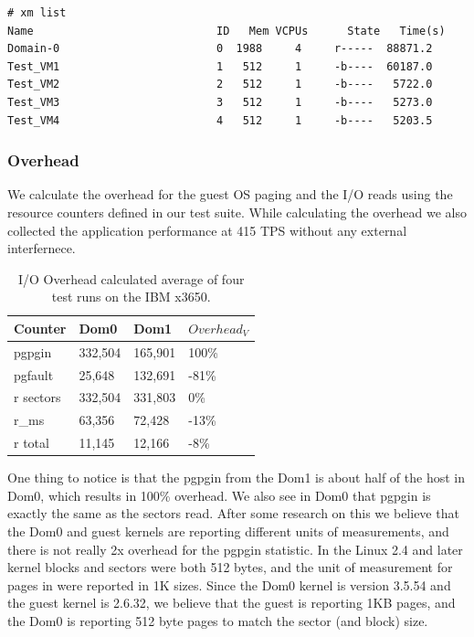 \begin{Verbatim}
# xm list
Name                            ID   Mem VCPUs      State   Time(s)
Domain-0                        0  1988     4     r-----  88871.2
Test_VM1                        1   512     1     -b----  60187.0
Test_VM2                        2   512     1     -b----   5722.0
Test_VM3                        3   512     1     -b----   5273.0
Test_VM4                        4   512     1     -b----   5203.5
\end{Verbatim}

\subsubsection{Overhead}
We calculate the overhead for the guest OS paging and the I/O reads using the resource counters defined in our test suite.  While calculating the overhead we also collected the application performance at 415 TPS without any external interfernece.

\begin{table}[h]
\begin{tabular}{ l l l p{5cm} }
  Counter & Dom0 & Dom1 & $Overhead_V$ \\
  \hline
	pgpgin    & 332,504 & 165,901 & 100\% \\
	pgfault   &  25,648 & 132,691 & -81\% \\
	r sectors & 332,504 & 331,803 &   0\% \\
	r\_ms     &  63,356 &  72,428 & -13\% \\
	r total   &  11,145 &  12,166 &  -8\% \\
  \hline
\end{tabular}
\caption{I/O Overhead calculated average of four test runs on the IBM x3650.}
\label{tab:OverheadSmall}
\end{table}

One thing to notice is that the pgpgin from the Dom1 is about half of the host in Dom0, which results in 100\% overhead.  
We also see in Dom0 that pgpgin is exactly the same as the sectors read.  
After some research on this we believe that the Dom0 and guest kernels are reporting different units of measurements, and there is not really 2x overhead for the pgpgin statistic.  
In the Linux 2.4 and later kernel blocks and sectors were both 512 bytes, and the unit of measurement for pages in were reported in 1K sizes.  Since the Dom0 kernel is version 3.5.54 and the guest kernel is 2.6.32, we believe that the guest is reporting 1KB pages, and the Dom0 is reporting 512 byte pages to match the sector (and block) size. 

